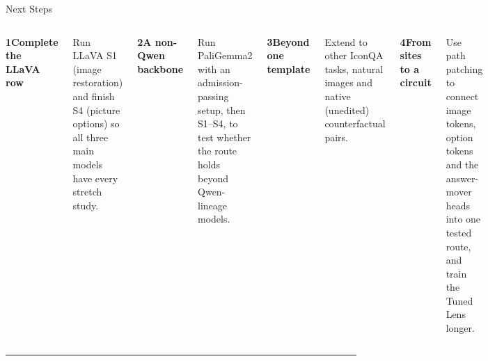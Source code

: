 \documentclass[aspectratio=169,12pt]{beamer}
\newcommand{\headfont}{\fontfamily{qhv}\fontseries{b}\selectfont}
\newcommand{\heading}[1]{{\headfont\textls[-45]{\MakeUppercase{#1}}}}
\newcommand{\methoditem}[3]{%
  {\fontsize{8.4}{10}\selectfont\textbf{#1}\hspace{0.6em}\textbf{#2}\par}
  \vspace{2pt}
  {\fontsize{7.6}{9.2}\selectfont #3\par}
  \vspace{0.24cm}
}
\newcommand{\sectionslide}[1]{%
  \begin{frame}[plain]
    \vfill
    \begin{center}
      {\fontsize{46}{50}\color{Ink}\heading{#1}}\par
      \vspace{0.30cm}
      {\color{Rule}\rule{0.55\textwidth}{0.45pt}}
    \end{center}
    \vfill
  \end{frame}
}
\begin{document}
\begin{frame}{Next Steps}
\begin{columns}[T,onlytextwidth]
\raggedright
\methoditem{1}{Complete the LLaVA row}{Run LLaVA S1 (image restoration) and finish S4 (picture options) so all three main models have every stretch study.}
\methoditem{2}{A non-Qwen backbone}{Run PaliGemma2 with an admission-passing setup, then S1--S4, to test whether the route holds beyond Qwen-lineage models.}
\raggedright
\methoditem{3}{Beyond one template}{Extend to other IconQA tasks, natural images and native (unedited) counterfactual pairs.}
\methoditem{4}{From sites to a circuit}{Use path patching to connect image tokens, option tokens and the answer-mover heads into one tested route, and train the Tuned Lens longer.}
\end{columns}
\end{frame}

\sectionslide{Appendix}
\end{document}
